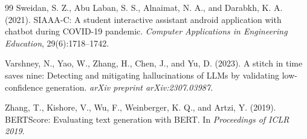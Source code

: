 \documentclass[a4paper,twoside]{article}
\begin{document}
{\begin{thebibliography}{99}
 Sweidan, S. Z., Abu Laban, S. S., Alnaimat, N. A., and Darabkh, K. A. (2021). SIAAA-C: A student interactive assistant android application with chatbot during COVID-19 pandemic. \textit{Computer Applications in Engineering Education}, 29(6):1718--1742.

 Varshney, N., Yao, W., Zhang, H., Chen, J., and Yu, D. (2023). A stitch in time saves nine: Detecting and mitigating hallucinations of LLMs by validating low-confidence generation. \textit{arXiv preprint arXiv:2307.03987}.

 Zhang, T., Kishore, V., Wu, F., Weinberger, K. Q., and Artzi, Y. (2019). BERTScore: Evaluating text generation with BERT. In \textit{Proceedings of ICLR 2019}.

\end{thebibliography}
}
\end{document}
